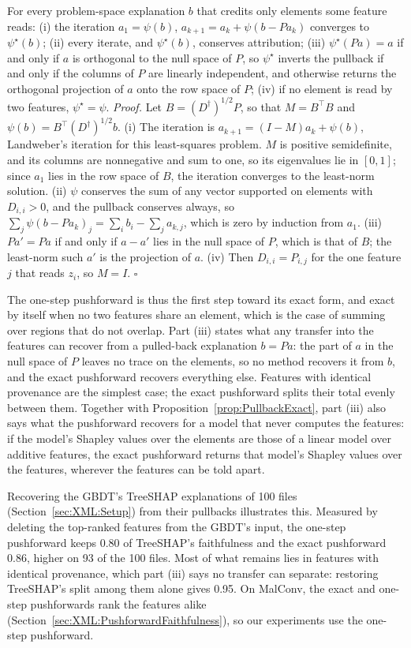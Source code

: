 \label{prop:ExactPushforward}
{
For every problem-space explanation $b$ that credits only elements some feature reads:
(i) the iteration $a_1 = \psi(b)$, $a_{k+1} = a_k + \psi(b - P a_k)$ converges to $\psi^\star(b)$;
(ii) every iterate, and $\psi^\star(b)$, conserves attribution;
(iii) $\psi^\star(Pa) = a$ if and only if $a$ is orthogonal to the null space of $P$, so $\psi^\star$ inverts the
pullback if and only if the columns of $P$ are linearly independent, and otherwise returns the orthogonal projection of
$a$ onto the row space of $P$;
(iv) if no element is read by two features, $\psi^\star = \psi$.
\textit{Proof.} Let $B = (D^\dagger)^{1/2} P$, so that $M = B^\top B$ and $\psi(b) = B^\top (D^\dagger)^{1/2} b$.
(i) The iteration is $a_{k+1} = (I - M) a_k + \psi(b)$, Landweber's iteration for this least-squares problem. $M$ is
positive semidefinite, and its columns are nonnegative and sum to one, so its eigenvalues lie in $[0, 1]$; since $a_1$
lies in the row space of $B$, the iteration converges to the least-norm solution. (ii) $\psi$ conserves the sum of any
vector supported on elements with $D_{i,i} > 0$, and the pullback conserves always, so
$\sum_j \psi(b - P a_k)_j = \sum_i b_i - \sum_j a_{k,j}$, which is zero by induction from $a_1$. (iii) $Pa' = Pa$ if and
only if $a - a'$ lies in the null space of $P$, which is that of $B$; the least-norm such $a'$ is the projection of $a$.
(iv) Then $D_{i,i} = P_{i,j}$ for the one feature $j$ that reads $z_i$, so $M = I$. \hfill$\square$
}

The one-step pushforward is thus the first step toward its exact form, and exact by itself when no two features share
an element, which is the case of summing over regions that do not overlap. Part (iii) states what any transfer into the
features can recover from a pulled-back explanation $b = Pa$: the part of $a$ in the null space of $P$ leaves no trace on the elements, so no method recovers
it from $b$, and the exact pushforward recovers everything else. Features with identical provenance are the simplest
case; the exact pushforward splits their total evenly between them. Together with Proposition~\ref{prop:PullbackExact},
part (iii) also says what the pushforward recovers for a model that never computes the features: if the model's Shapley
values over the elements are those of a linear model over additive features, the exact pushforward returns that model's
Shapley values over the features, wherever the features can be told apart.

Recovering the GBDT's TreeSHAP explanations of 100 files (Section~\ref{sec:XML:Setup}) from their pullbacks illustrates
this. Measured by deleting the top-ranked features from the GBDT's input, the one-step pushforward keeps 0.80 of
TreeSHAP's faithfulness and the exact pushforward 0.86, higher on 93 of the 100 files. Most of what remains lies in
features with identical provenance, which part (iii) says no transfer can separate: restoring TreeSHAP's split among
them alone gives 0.95. On MalConv, the exact and one-step pushforwards rank the features alike
(Section~\ref{sec:XML:PushforwardFaithfulness}), so our experiments use the one-step pushforward.



